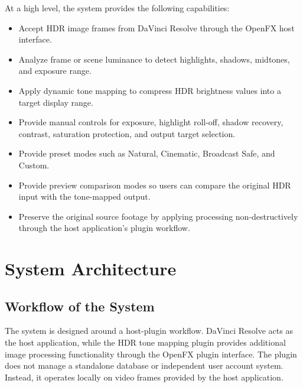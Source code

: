 \documentclass[12pt,hyphens]{article}
\begin{document}
At a high level, the system provides the following capabilities:

\begin{itemize}[leftmargin=0.35in]
    \item Accept HDR image frames from DaVinci Resolve through the OpenFX host interface.
    \item Analyze frame or scene luminance to detect highlights, shadows, midtones, and exposure range.
    \item Apply dynamic tone mapping to compress HDR brightness values into a target display range.
    \item Provide manual controls for exposure, highlight roll-off, shadow recovery, contrast, saturation protection, and output target selection.
    \item Provide preset modes such as Natural, Cinematic, Broadcast Safe, and Custom.
    \item Provide preview comparison modes so users can compare the original HDR input with the tone-mapped output.
    \item Preserve the original source footage by applying processing non-destructively through the host application's plugin workflow.
\end{itemize}


\section{System Architecture}

\subsection{Workflow of the System}
The system is designed around a host-plugin workflow. DaVinci Resolve acts as the host application, while the HDR tone mapping plugin provides additional image processing functionality through the OpenFX plugin interface. The plugin does not manage a standalone database or independent user account system. Instead, it operates locally on video frames provided by the host application.
\end{document}
